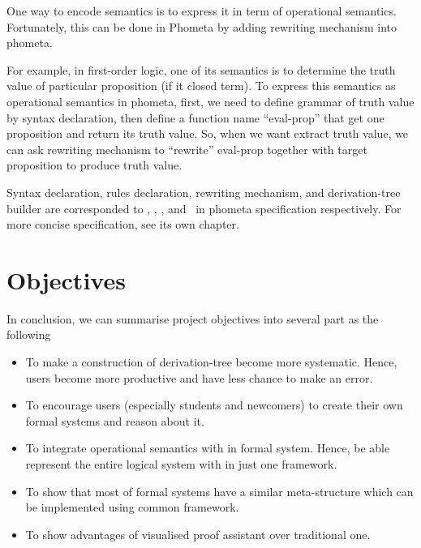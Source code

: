One way to encode semantics is to express it in term of operational semantics. Fortunately, this can be done in Phometa by adding rewriting mechanism into phometa.

For example, in first-order logic, one of its semantics is to determine the truth value of particular proposition (if it closed term). To express this semantics as operational semantics in phometa, first, we need to define grammar of truth value by syntax declaration, then define a function name ``eval-prop'' that get one proposition and return its truth value. So, when we want extract truth value, we can ask rewriting mechanism to ``rewrite'' eval-prop together with target proposition to produce truth value.

Syntax declaration, rules declaration, rewriting mechanism, and derivation-tree builder are corresponded to \kGrammar, \kRule, \kDefinition, and \kTheorem\ in phometa specification respectively. For more concise specification, see its own chapter.

\section{Objectives}
In conclusion, we can summarise project objectives into several part as the following
\begin{itemize}
  \item To make a construction of derivation-tree become more systematic. Hence, users become more productive and have less chance to make an error.
  \item To encourage users (especially students and newcomers) to create their own formal systems and reason about it.
  \item To integrate operational semantics with in formal system. Hence, be able represent the entire logical system with in just one framework.
  \item To show that most of formal systems have a similar meta-structure which can be implemented using common framework.
  \item To show advantages of visualised proof assistant over traditional one.
\end{itemize}
